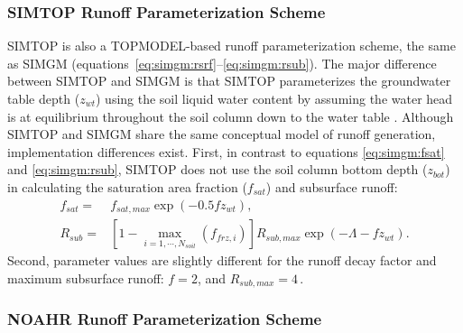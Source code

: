 \documentclass[essd, manuscript]{copernicus}
\let\unit\undefined
\begin{document}
\subsubsection{SIMTOP Runoff Parameterization Scheme}\label{sec:data:noahmp:simtop}

SIMTOP is also a TOPMODEL-based runoff parameterization scheme, the same as SIMGM (equations~\eqref{eq:simgm:rsrf}--\eqref{eq:simgm:rsub}). The major difference between SIMTOP and SIMGM is that SIMTOP parameterizes the groundwater table depth (\(z_{wt}\)) using the soil liquid water content by assuming the water head is at equilibrium throughout the soil column down to the water table \citep{niu2005JGRA}. Although SIMTOP and SIMGM share the same conceptual model of runoff generation, implementation differences exist. First, in contrast to equations \eqref{eq:simgm:fsat} and \eqref{eq:simgm:rsub}, SIMTOP does not use the soil column bottom depth (\(z_{bot}\)) in calculating the saturation area fraction (\(f_{sat}\)) and subsurface runoff:
\begin{align}
  f_{sat} = & f_{sat,max} \exp(-0.5 f z_{wt})
  \text{,} \\
  R_{sub} = & [1-\max_{i=1,\cdots,N_{soil}}(f_{frz,i})]
  R_{sub,max} \exp(-\Lambda - f z_{wt})
  \text{.}
\end{align}
Second, parameter values are slightly different for the runoff decay factor and maximum subsurface runoff: \(f=2\), and \(R_{sub,max}=4\)\,\unit{kg.m^{-2}.s^{-1}}.

\subsubsection{NOAHR Runoff Parameterization Scheme}\label{sec:data:noahmp:noahr}
\end{document}
